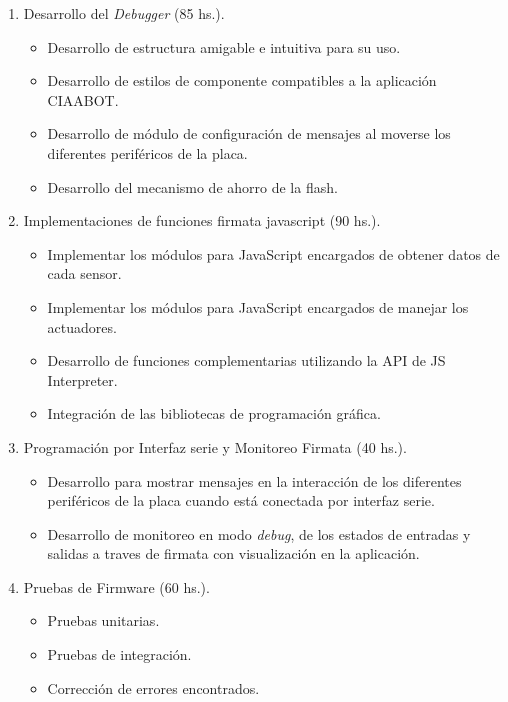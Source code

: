 \begin{enumerate}
	\item Desarrollo del \emph{Debugger} (85 hs.).
	
	\begin{itemize}
		\item Desarrollo de estructura amigable e intuitiva para su uso.
		\item Desarrollo de estilos de componente compatibles a la aplicación CIAABOT.
		\item Desarrollo de módulo de configuración de mensajes al moverse los diferentes periféricos de la placa.
		\item Desarrollo del mecanismo de ahorro de la flash.
	\end{itemize}
	
	\item Implementaciones de funciones firmata javascript (90 hs.).
	
	\begin{itemize}
		\item Implementar los módulos para JavaScript encargados de obtener datos de cada sensor.
		\item Implementar los módulos para JavaScript encargados de manejar los actuadores.
		\item Desarrollo de funciones complementarias utilizando la API de JS Interpreter.
		\item Integración de las bibliotecas de programación gráfica.
	\end{itemize}

	\item Programación por Interfaz serie y Monitoreo Firmata (40 hs.).
	
	\begin{itemize}
		\item Desarrollo para mostrar mensajes en la interacción de los diferentes periféricos de la placa cuando está conectada por interfaz serie.
		\item Desarrollo de monitoreo en modo \emph{debug}, de los estados de entradas y salidas a traves de firmata con visualización en la aplicación.
	\end{itemize}

	\item Pruebas de Firmware (60 hs.).
	
	\begin{itemize}
		\item Pruebas unitarias.
		\item Pruebas de integración.
		\item Corrección de errores encontrados.
	\end{itemize}


\end{enumerate}
